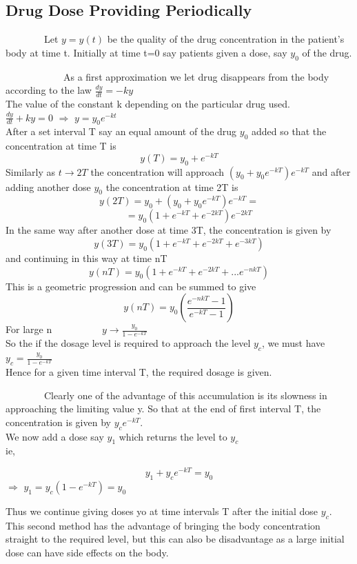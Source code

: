 \subsection{Drug Dose Providing Periodically}

\par ~~~~~~~~Let $y=y(t)$ be the quality of the drug concentration in the patient’s body at time t. Initially at time t=0 say patients given a dose, say $y_{0}$ of the drug.
\par ~~~~~~~~~~~~As a first approximation we let drug disappears from the body according to the law $\frac{dy}{dt}=-ky$ \\
The value of the constant k depending on the particular drug used.\\
$\frac{dy}{dt}+ky=0$ $\Rightarrow$ $y=y_{0}e^{-kt}$ \\
After a set interval T say an equal
amount of the drug $y_{0}$ added so that the concentration at time T is 
$$y(T)=y_{0}+e^{-kT}$$
Similarly as $t\rightarrow 2T$ the concentration will approach $(y_{0}+y_{0}e^{-kT})e^{-kT}$ and after adding another dose $y_{0}$ the concentration at time 2T is 
$$y(2T)=y_{0}+(y_{0}+y_{0}e^{-kT})e^{-kT}=$$ 
$$~~~~~~~~~=y_{0}(1+e^{-kT}+e^{-2kT})e^{-2kT}$$ 
In the same way after another dose at time 3T, the concentration is given by 
$$y(3T)=y_{0}(1+e^{-kT}+e^{-2kT}+e^{-3kT})$$ 
and continuing in this way at time nT
$$y(nT)=y_{0}(1+e^{-kT}+e^{-2kT}+...e^{-nkT})$$
This is a geometric progression and can be summed to give
$$y(nT)=y_{0}(\frac{e^{-nkT}-1}{e^{-kT}-1})$$
For large n $~~~~~~~~~~~~~~~~~~~~~~y\rightarrow \frac{y_{0}}{1-e^{-kT}}$ \\
So the if the dosage level is required to approach the level $y_{c}$, we must have $y_{c}=\frac{y_{0}}{1-e^{-kT}}$ \\
Hence for a given time interval T, the required dosage is given.
\par ~~~~~~~~Clearly one of the advantage of this accumulation is its slowness in approaching the limiting value y. So that at the end of first interval T, the concentration is given by $y_{c}e^{-kT}$.\\ We now add a dose say $y_{1}$ which returns the level to $y_{c}$ \\
ie,  \begin{center}
	$$y_{1}+y_{c}e^{-kT}=y_{0}$$
	$\Rightarrow$  $y_{1}=y_{c}(1-e^{-kT})=y_{0}$
\end{center}
Thus we continue giving doses yo at time intervals T after the initial dose $y_{c}$. This second method has the advantage of bringing the body concentration straight to the required level, but this can also be disadvantage as a large initial dose can have side effects on the body.

